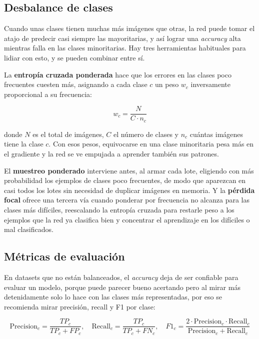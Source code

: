 \documentclass[12pt,letterpaper]{article}
\begin{document}
\subsection{Desbalance de clases}

Cuando unas clases tienen muchas m\'as im\'agenes que otras, la red puede tomar el atajo de predecir casi siempre las mayoritarias, y as\'i lograr una \textit{accuracy} alta mientras falla en las clases minoritarias. Hay tres herramientas habituales para lidiar con esto, y se pueden combinar entre s\'i.

La \textbf{entrop\'ia cruzada ponderada} hace que los errores en las clases poco frecuentes cuesten m\'as, asignando a cada clase $c$ un peso $w_c$ inversamente proporcional a su frecuencia:

\begin{equation}
w_c = \frac{N}{C \cdot n_c}
\end{equation}

donde $N$ es el total de im\'agenes, $C$ el n\'umero de clases y $n_c$ cu\'antas im\'agenes tiene la clase $c$. Con esos pesos, equivocarse en una clase minoritaria pesa m\'as en el gradiente y la red se ve empujada a aprender tambi\'en sus patrones.

El \textbf{muestreo ponderado} interviene antes, al armar cada lote, eligiendo con m\'as probabilidad los ejemplos de clases poco frecuentes, de modo que aparezcan en casi todos los lotes sin necesidad de duplicar im\'agenes en memoria. Y la \textbf{p\'erdida focal} ofrece una tercera v\'ia cuando ponderar por frecuencia no alcanza para las clases m\'as dif\'iciles, reescalando la entrop\'ia cruzada para restarle peso a los ejemplos que la red ya clasifica bien y concentrar el aprendizaje en los dif\'iciles o mal clasificados.

\subsection{M\'etricas de evaluaci\'on}

En datasets que no están balanceados, el \textit{accuracy} deja de ser confiable para evaluar un modelo, porque puede parecer bueno acertando pero al mirar más detenidamente solo lo hace con las clases más representadas, por eso se recomienda mirar precisi\'on, recall y F1 por clase:

\begin{equation}
\text{Precision}_c = \frac{TP_c}{TP_c + FP_c}, \quad \text{Recall}_c = \frac{TP_c}{TP_c + FN_c}, \quad F1_c = \frac{2 \cdot \text{Precision}_c \cdot \text{Recall}_c}{\text{Precision}_c + \text{Recall}_c}
\end{equation}
\end{document}
